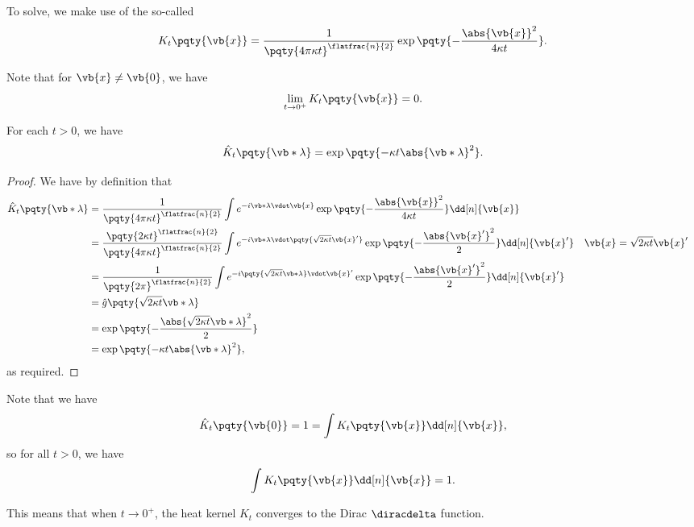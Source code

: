 To solve, we make use of the so-called 
\begin{equation}
    K_t \pqty{\vb{x}} = \frac{1}{\pqty{4 \pi \kappa t}^{\flatfrac{n}{2}}} \exp\pqty{- \frac{\abs{\vb{x}}^2}{4 \kappa t}}.
\end{equation}

Note that for \(\vb{x} \neq \vb{0}\), we have
\begin{equation}
    \lim_{t \to 0^+} K_t \pqty{\vb{x}} = 0.
\end{equation}

\begin{proposition}
    For each \(t > 0\), we have
    \[
        \hat{K}_t \pqty{\vb*{\lambda}} = \exp\pqty{- \kappa t \abs{\vb*{\lambda}}^2}.
    \]
\end{proposition}

\begin{proof}
    We have by definition that
    \begin{subequations}
        \begin{align}
            \hat{K}_t \pqty{\vb*{\lambda}} &=\frac{1}{\pqty{4 \pi \kappa t}^{\flatfrac{n}{2}}} \int e^{- i \vb*{\lambda} \vdot \vb{x}} \exp\pqty{- \frac{\abs{\vb{x}}^2}{4 \kappa t}} \dd[n]{\vb{x}} \\
            &= \frac{\pqty{2 \kappa t}^{\flatfrac{n}{2}}}{\pqty{4 \pi \kappa t}^{\flatfrac{n}{2}}} \int e^{- i \vb*{\lambda} \vdot \pqty{\sqrt{2 \kappa t} \vb{x}'}} \exp\pqty{- \frac{\abs{\vb{x}'}^2}{2}} \dd[n]{\vb{x}'} && \vb{x} = \sqrt{2 \kappa t} \vb{x}' \\
            &= \frac{1}{\pqty{2 \pi}^{\flatfrac{n}{2}}} \int e^{- i \pqty{\sqrt{2 \kappa t} \vb*{\lambda}} \vdot \vb{x}'} \exp\pqty{- \frac{\abs{\vb{x}'}^2}{2}} \dd[n]{\vb{x}'} \\
            &= \hat{g} \pqty{\sqrt{2 \kappa t} \vb*{\lambda}} \\
            &= \exp\pqty{- \frac{\abs{\sqrt{2 \kappa t} \vb*{\lambda}}^2}{2}} \\
            &= \exp\pqty{- \kappa t \abs{\vb*{\lambda}}^2},
        \end{align}
    \end{subequations}
    as required.
\end{proof}

\begin{remark}
    Note that we have
    \begin{equation}
        \hat{K}_t \pqty{\vb{0}} = 1 = \int K_t \pqty{\vb{x}} \dd[n]{\vb{x}},
    \end{equation}
    so for all \(t > 0\), we have
    \begin{equation}
        \int K_t \pqty{\vb{x}} \dd[n]{\vb{x}} = 1.
    \end{equation}

    This means that when \(t \to 0^+\), the heat kernel \(K_t\) converges to the Dirac \(\diracdelta\) function.
\end{remark}

